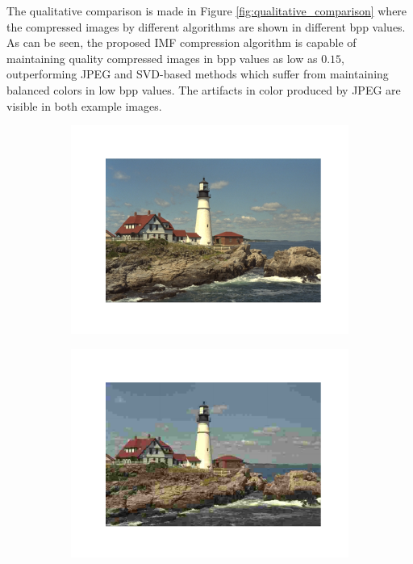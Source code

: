 The qualitative comparison is made in Figure \ref{fig:qualitative_comparison} where the compressed images by different algorithms are shown in different bpp values.
As can be seen, the proposed IMF compression algorithm is capable of maintaining quality compressed images in bpp values as low as $0.15$, outperforming JPEG and SVD-based methods which suffer from maintaining balanced colors in low bpp values. 
The artifacts in color produced by JPEG are visible in both example images.
\begin{figure}[t]
	\centering
	\begin{subfigure}{.23\textwidth}
		\centering
		\includegraphics[trim=1.7cm 1.5cm 1.7cm 1.7cm, clip, width=1\textwidth]{figures/kodim21_original.pdf}
        \vspace{-20pt}
        \caption*{}
	\end{subfigure}%
	\begin{subfigure}{.23\textwidth}
		\centering
		\includegraphics[trim=1.7cm 1.5cm 1.7cm 1.7cm, clip, width=1\textwidth]{figures/kodim21_JPEG_bpp_0.293.pdf}

\end{subfigure}
\end{figure}
